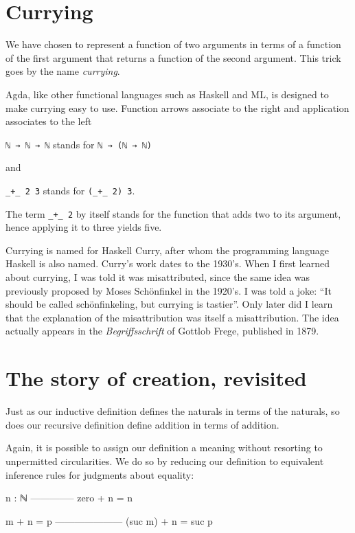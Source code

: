 \hypertarget{currying}{%
\section{Currying}\label{currying}}

We have chosen to represent a function of two arguments in terms of a
function of the first argument that returns a function of the second
argument. This trick goes by the name \emph{currying}.

Agda, like other functional languages such as Haskell and ML, is
designed to make currying easy to use. Function arrows associate to the
right and application associates to the left

\texttt{ℕ\ →\ ℕ\ →\ ℕ} stands for \texttt{ℕ\ →\ (ℕ\ →\ ℕ)}

and

\texttt{\_+\_\ 2\ 3} stands for \texttt{(\_+\_\ 2)\ 3}.

The term \texttt{\_+\_\ 2} by itself stands for the function that adds
two to its argument, hence applying it to three yields five.

Currying is named for Haskell Curry, after whom the programming language
Haskell is also named. Curry's work dates to the 1930's. When I first
learned about currying, I was told it was misattributed, since the same
idea was previously proposed by Moses Schönfinkel in the 1920's. I was
told a joke: ``It should be called schönfinkeling, but currying is
tastier''. Only later did I learn that the explanation of the
misattribution was itself a misattribution. The idea actually appears in
the \emph{Begriffsschrift} of Gottlob Frege, published in 1879.

\hypertarget{the-story-of-creation-revisited}{%
\section{The story of creation,
revisited}\label{the-story-of-creation-revisited}}

Just as our inductive definition defines the naturals in terms of the
naturals, so does our recursive definition define addition in terms of
addition.

Again, it is possible to assign our definition a meaning without
resorting to unpermitted circularities. We do so by reducing our
definition to equivalent inference rules for judgments about equality:

\begin{myDisplay}
n : ℕ
--------------
zero + n  =  n

m + n  =  p
---------------------
(suc m) + n  =  suc p
\end{myDisplay}

